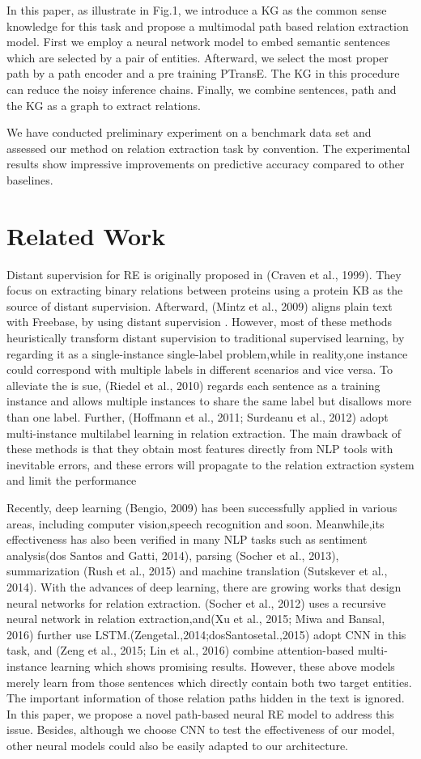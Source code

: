 In this paper, as illustrate in Fig.1, we introduce a KG as the common sense knowledge for this task and propose a multimodal path based relation extraction model. First we employ a neural network model to embed semantic sentences which are selected by a pair of entities. Afterward, we select the most proper path by a path encoder and a pre training PTransE. The KG in this procedure can reduce the noisy inference chains. Finally, we combine sentences, path and the KG as a graph to extract relations.

We have conducted preliminary experiment on a benchmark data set and assessed our method on relation extraction task by convention. The experimental results show impressive improvements on predictive accuracy compared to other baselines.

\section{Related Work}
Distant supervision for RE is originally proposed in (Craven et al., 1999). They focus on extracting binary relations between proteins using a protein KB as the source of distant supervision. Afterward, (Mintz et al., 2009) aligns plain text with Freebase, by using distant supervision . However, most of these methods heuristically transform distant supervision to traditional supervised learning, by regarding it as a single-instance single-label problem,while in reality,one instance could correspond with multiple labels in different scenarios and vice versa. To alleviate the is sue, (Riedel et al., 2010) regards each sentence as a training instance and allows multiple instances to share the same label but disallows more than one label. Further, (Hoffmann et al., 2011; Surdeanu et al., 2012) adopt multi-instance multilabel learning in relation extraction. The main drawback of these methods is that they obtain most features directly from NLP tools with inevitable errors, and these errors will propagate to the relation extraction system and limit the performance

Recently, deep learning (Bengio, 2009) has been successfully applied in various areas, including computer vision,speech recognition and soon. Meanwhile,its effectiveness has also been verified in many NLP tasks such as sentiment analysis(dos Santos and Gatti, 2014), parsing (Socher et al., 2013), summarization (Rush et al., 2015) and machine translation (Sutskever et al., 2014). With the advances of deep learning, there are growing works that design neural networks for relation extraction. (Socher et al., 2012) uses a recursive neural network in relation extraction,and(Xu et al., 2015; Miwa and Bansal, 2016) further use LSTM.(Zengetal.,2014;dosSantosetal.,2015) adopt CNN in this task, and (Zeng et al., 2015; Lin et al., 2016) combine attention-based multi-instance learning which shows promising results. However, these above models merely learn from those sentences which directly contain both two target entities. The important information of those relation paths hidden in the text is ignored. In this paper, we propose a novel path-based neural RE model to address this issue. Besides, although we choose CNN to test the effectiveness of our model, other neural models could also be easily adapted to our architecture.

